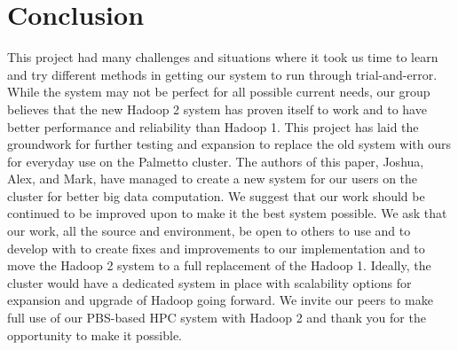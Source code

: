 \documentclass[conference]{IEEEtran}
\begin{document}
	\section{Conclusion}
			This project had many challenges and situations where it took us time to learn and try different methods in getting our system to run through trial-and-error. While the system may not be perfect for all possible current needs, our group believes that the new Hadoop 2 system has proven itself to work and to have better performance and reliability than Hadoop 1. This project has laid the groundwork for further testing and expansion to replace the old system with ours for everyday use on the Palmetto cluster. The authors of this paper, Joshua, Alex, and Mark, have managed to create a new system for our users on the cluster for better big data computation. We suggest that our work should be continued to be improved upon to make it the best system possible. We ask that our work\cite{projectcode}, all the source and environment, be open to others to use and to develop with to create fixes and improvements to our implementation and to move the Hadoop 2 system to a full replacement of the Hadoop 1. Ideally, the cluster would have a dedicated system in place with scalability options for expansion and upgrade of Hadoop going forward. We invite our peers to make full use of our PBS-based HPC system with Hadoop 2 and thank you for the opportunity to make it possible.





\end{document}
